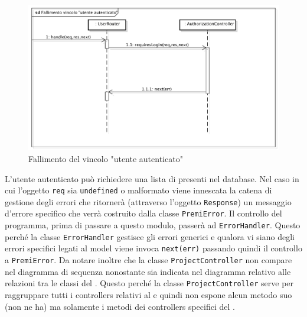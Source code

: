 \begin{center}
\begin{figure}[h]
\centering
\includegraphics[scale=0.35,keepaspectratio]{diagrammi/sequenza/BackEnd/userFailed.pdf}
\caption{Fallimento del vincolo "utente autenticato"}
\end{figure}
\FloatBarrier
\end{center}
\label{projFailed}
L'utente autenticato può richiedere una lista di  presenti nel database.  Nel caso in cui l'oggetto \texttt{req} sia \texttt{undefined} o malformato viene innescata la catena di gestione degli errori che ritornerà (attraverso l'oggetto \texttt{Response}) un messaggio d'errore specifico che verrà costruito dalla classe \texttt{PremiError}. Il controllo del programma, prima di passare a questo modulo, passerà ad \texttt{ErrorHandler}. Questo perché la classe \texttt{ErrorHandler} gestisce gli errori generici e qualora vi siano degli errori specifici legati al model viene invoca \texttt{next(err)} passando quindi il controllo a \texttt{PremiError}. Da notare inoltre che la classe \texttt{ProjectController} non compare nel diagramma di sequenza nonostante sia indicata nel diagramma relativo alle relazioni tra le classi del . Questo perché la classe \texttt{ProjectController} serve per raggruppare tutti i controllers relativi al  e quindi non espone alcun metodo suo (non ne ha) ma solamente i metodi dei controllers specifici del .
